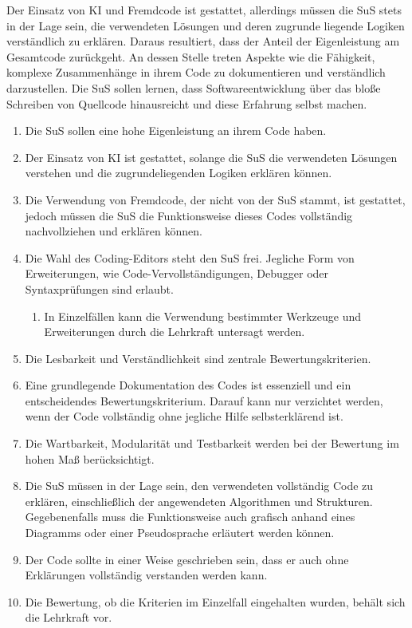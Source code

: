 \documentclass[a4paper,12pt]{article}
\begin{document}
Der Einsatz von KI und Fremdcode ist gestattet, allerdings müssen die SuS stets in der Lage sein, die verwendeten Lösungen und deren zugrunde liegende Logiken verständlich zu erklären. Daraus resultiert, dass der Anteil der Eigenleistung am Gesamtcode zurückgeht. An dessen Stelle treten Aspekte wie die Fähigkeit, komplexe Zusammenhänge in ihrem Code zu dokumentieren und verständlich darzustellen. Die SuS sollen lernen, dass Softwareentwicklung über das bloße Schreiben von Quellcode hinausreicht und diese Erfahrung selbst machen.

\begin{enumerate}[label=\S\ \arabic*]
    \item Die SuS sollen eine hohe Eigenleistung an ihrem Code haben.
    \item Der Einsatz von KI ist gestattet, solange die SuS die verwendeten Lösungen verstehen und die zugrundeliegenden Logiken erklären können.
    \item Die Verwendung von Fremdcode, der nicht von der SuS stammt, ist gestattet, jedoch müssen die SuS die Funktionsweise dieses Codes vollständig nachvollziehen und erklären können.
    \item Die Wahl des Coding-Editors steht den SuS frei. Jegliche Form von Erweiterungen, wie Code-Vervollständigungen, Debugger oder Syntaxprüfungen sind erlaubt.
    \begin{enumerate}[label=\S\ \arabic*\alph*]
        \item In Einzelfällen kann die Verwendung bestimmter Werkzeuge und Erweiterungen durch die Lehrkraft untersagt werden.
    \end{enumerate}
    \item Die Lesbarkeit und Verständlichkeit sind zentrale Bewertungskriterien.
    \item Eine grundlegende Dokumentation des Codes ist essenziell und ein entscheidendes Bewertungskriterium. Darauf kann nur verzichtet werden, wenn der Code vollständig ohne jegliche Hilfe selbsterklärend ist.
    \item Die Wartbarkeit, Modularität und Testbarkeit werden bei der Bewertung im hohen Maß berücksichtigt.
    \item Die SuS müssen in der Lage sein, den verwendeten vollständig Code zu erklären, einschließlich der angewendeten Algorithmen und Strukturen. Gegebenenfalls muss die Funktionsweise auch grafisch anhand eines Diagramms oder einer Pseudosprache erläutert werden können.
    \item Der Code sollte in einer Weise geschrieben sein, dass er auch ohne Erklärungen vollständig verstanden werden kann.
    \item Die Bewertung, ob die Kriterien im Einzelfall eingehalten wurden, behält sich die Lehrkraft vor.
\end{enumerate}
\end{document}

